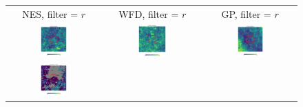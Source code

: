 \documentclass[preprintm,linenumbers]{aastex631}
\begin{document}
  
  	\begin{figure}
			\centering
			\begin{tabular}{  c c c}
                 NES, filter = $r$ & WFD, filter = $r$ & GP, filter = $r$ \\
				\includegraphics[width=0.3\textwidth]{results/skymaps_cutout/skymaps_cutout_first_year_one_snap_v4_0_10yrs_db_noDD_noTwi_nside-256_CountMetric_r_NES_noDD_noTwi.pdf} &
				\includegraphics[width=0.3\textwidth]{results/skymaps_cutout/skymaps_cutout_first_year_one_snap_v4_0_10yrs_db_noDD_noTwi_nside-256_CountMetric_r_WFD_noDD_noTwi.pdf} &
				\includegraphics[width=0.3\textwidth]{results/skymaps_cutout/skymaps_cutout_first_year_one_snap_v4_0_10yrs_db_noDD_noTwi_nside-256_CountMetric_r_GP_noDD_noTwi.pdf} \\
				\includegraphics[width=0.3\textwidth]{results/skymaps_cutout/skymaps_cutout_first_year_one_snap_v4_0_10yrs_db_noDD_noTwi_tscale-28_nside-256_doAllTemplateMetrics_reduceCount_r_NES_noDD_noTwi.pdf} &

\end{tabular}
\end{figure}
\end{document}
